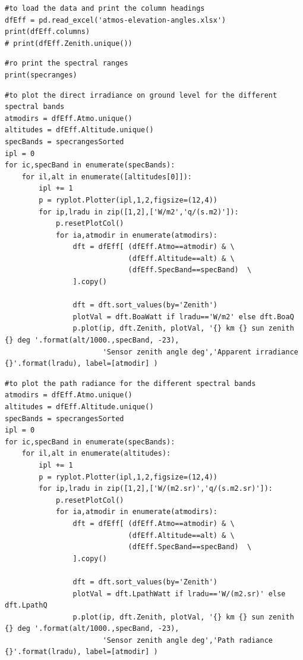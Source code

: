 \documentclass{workpackage}
\begin{document}
\begin{lstlisting}[style=incellstyle,caption={Code Listing in cell 35 \label{lst:autolistingcell35}}]
#to load the data and print the column headings
dfEff = pd.read_excel('atmos-elevation-angles.xlsx')
print(dfEff.columns)
# print(dfEff.Zenith.unique())
\end{lstlisting}


\begin{lstlisting}[style=incellstyle,caption={Code Listing in cell 37 \label{lst:autolistingcell37}}]
#ro print the spectral ranges
print(specranges)
\end{lstlisting}


\begin{lstlisting}[style=incellstyle,caption={Code Listing in cell 40 \label{lst:autolistingcell40}}]
#to plot the direct irradiance on ground level for the different spectral bands
atmodirs = dfEff.Atmo.unique()
altitudes = dfEff.Altitude.unique()
specBands = specrangesSorted
ipl = 0
for ic,specBand in enumerate(specBands):
    for il,alt in enumerate([altitudes[0]]):
        ipl += 1
        p = ryplot.Plotter(ipl,1,2,figsize=(12,4))
        for ip,lradu in zip([1,2],['W/m2','q/(s.m2)']):
            p.resetPlotCol()
            for ia,atmodir in enumerate(atmodirs):
                dft = dfEff[ (dfEff.Atmo==atmodir) & \
                             (dfEff.Altitude==alt) & \
                             (dfEff.SpecBand==specBand)  \
                ].copy()

                dft = dft.sort_values(by='Zenith')
                plotVal = dft.BoaWatt if lradu=='W/m2' else dft.BoaQ
                p.plot(ip, dft.Zenith, plotVal, '{} km {} sun zenith {} deg '.format(alt/1000.,specBand, -23),
                       'Sensor zenith angle deg','Apparent irradiance {}'.format(lradu), label=[atmodir] )
\end{lstlisting}


\begin{lstlisting}[style=incellstyle,caption={Code Listing in cell 42 \label{lst:autolistingcell42}}]
#to plot the path radiance for the different spectral bands
atmodirs = dfEff.Atmo.unique()
altitudes = dfEff.Altitude.unique()
specBands = specrangesSorted
ipl = 0
for ic,specBand in enumerate(specBands):
    for il,alt in enumerate(altitudes):
        ipl += 1
        p = ryplot.Plotter(ipl,1,2,figsize=(12,4))
        for ip,lradu in zip([1,2],['W/(m2.sr)','q/(s.m2.sr)']):
            p.resetPlotCol()
            for ia,atmodir in enumerate(atmodirs):
                dft = dfEff[ (dfEff.Atmo==atmodir) & \
                             (dfEff.Altitude==alt) & \
                             (dfEff.SpecBand==specBand)  \
                ].copy()

                dft = dft.sort_values(by='Zenith')
                plotVal = dft.LpathWatt if lradu=='W/(m2.sr)' else dft.LpathQ
                p.plot(ip, dft.Zenith, plotVal, '{} km {} sun zenith {} deg '.format(alt/1000.,specBand, -23),
                       'Sensor zenith angle deg','Path radiance {}'.format(lradu), label=[atmodir] )
\end{lstlisting}
\end{document}
